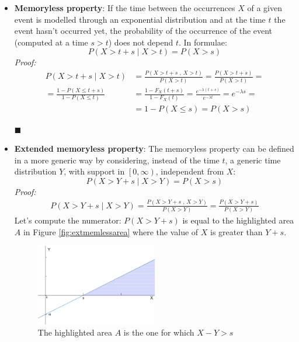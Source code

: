 \documentclass[12pt,a4paper]{article}
\begin{document}
\begin{itemize}
\item \textbf{Memoryless property}: 
If the time between the occurrences $X$ of a given event is modelled through an exponential distribution and at the time $t$ the event hasn't occurred yet, the probability of the occurrence of the event (computed at a time $s>t$) does not depend $t$. In formulae:
$$
P(X>t+s \mid X>t)= P(X>s)
$$
\emph{Proof:}
\begin{equation*}
\begin{split}
P(X>t+s \mid X>t) &= \frac{P(X>t+s \textrm{ , } X>t)}{P(X>t)} = \frac{P(X>t+s)}{P(X>t)}= \\
= \frac{1-P(X\leq t+s)}{1-P(X\leq t)} &=\frac{1-F_X(t+s)}{1-F_X(t)} = \frac{e^{-\lambda (t+s)}}{e^{-\lambda t}} = e^{-\lambda s} = \\
&= 1 - P(X \leq s) = P(X>s)
\end{split}
\end{equation*}
\begin{flushright}
$\blacksquare$
\end{flushright}
\item \textbf{Extended memoryless property}:
The memoryless property can be defined in a more generic way by considering, instead of the time $t$, a generic time distribution $Y$, with support in $\left[0,\infty \right)$, independent from $X$:
$$
P(X>Y+s \mid X>Y)=P(X>s)
$$
\emph{Proof:}
\begin{equation*}
\begin{split}
P(X>Y+s \mid X>Y) = \frac{P(X>Y+s \textrm{ , } X>Y)}{P(X>Y)} = \frac{P(X>Y+s)}{P(X>Y)} 
\end{split}
\end{equation*}
Let's compute the numerator: $P(X>Y+s)$ is equal to the highlighted area $A$ in Figure \ref{fig:extmemlessarea} where the value of $X$ is greater than $Y+s$.
\begin{figure}[H]
\begin{center}
\includegraphics[width=0.5\textwidth]{IMG/CommArea.eps}
\caption{The highlighted area $A$ is the one for which $X-Y>s$}

\end{center}
\end{figure}
\end{itemize}
\end{document}
